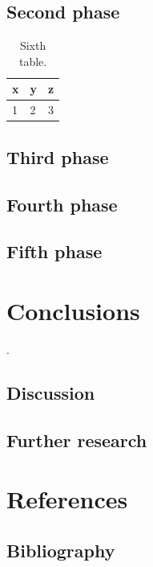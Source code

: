 \expandafter\documentclass\expandafter[\tfglang]{utad-tfg}
\begin{document}
\section{Second phase}
\lipsum[87-92]
\begin{table}[htbp]
  \centering
  \caption{Sixth table. }
  \begin{tabular}{lll}
    \toprule
    x & y & z \\
    \midrule
    1 & 2 & 3 \\
    \bottomrule
  \end{tabular}
\end{table}
\lipsum[93-98]

\section{Third phase}
\kant[6-12]

\section{Fourth phase}
\lipsum[121-135]

\section{Fifth phase}
\kant[13-20]

\chapter{Conclusions}
\lipsum[99-102] \parencite{ph17,ph18,ph19,ph20,ph21,ph22,ph23}.

\section{Discussion}
\lipsum[103-106]

\section{Further research}
\lipsum[107-109]
\lipsum[136-142]

\chapter{References}

\section{Bibliography}
\nocite{kimball2013,loshin2008,fielding2000}
\printbibliography[heading=none]
\end{document}
